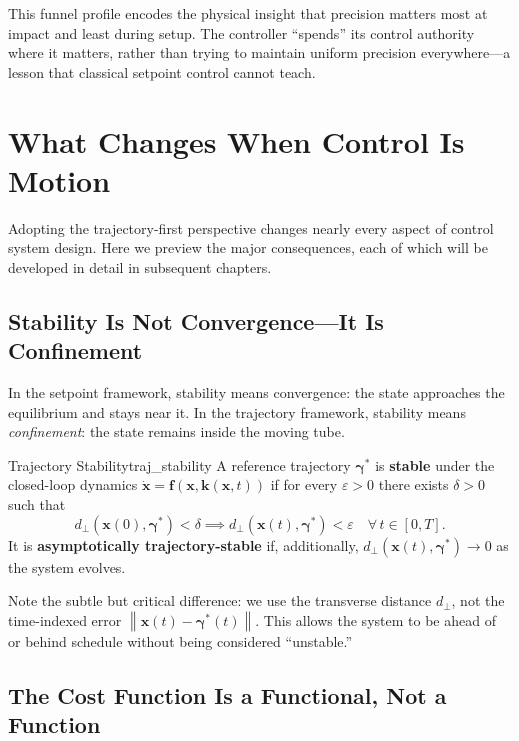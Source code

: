 \documentclass[12pt, openany]{book}
\theoremstyle{plain}
\newcommand{\state}{\bm{x}}
\newcommand{\traj}{\bm{\gamma}}
\newcommand{\norm}[1]{\left\lVert #1 \right\rVert}
\begin{document}
This funnel profile encodes the physical insight that precision matters most at
impact and least during setup. The controller ``spends'' its control authority
where it matters, rather than trying to maintain uniform precision everywhere---a
lesson that classical setpoint control cannot teach.

\section{What Changes When Control Is Motion}

Adopting the trajectory-first perspective changes nearly every aspect of control
system design. Here we preview the major consequences, each of which will be
developed in detail in subsequent chapters.

\subsection{Stability Is Not Convergence---It Is Confinement}

In the setpoint framework, stability means convergence: the state approaches the
equilibrium and stays near it. In the trajectory framework, stability means
\emph{confinement}: the state remains inside the moving tube.

\begin{definition}{Trajectory Stability}{traj_stability}
  A reference trajectory $\traj^*$ is \textbf{stable} under the closed-loop
  dynamics $\dot{\state} = \bm{f}(\state, \bm{k}(\state, t))$ if for every
  $\varepsilon > 0$ there exists $\delta > 0$ such that
  \begin{equation}
    d_\perp(\state(0), \traj^*) < \delta \implies
    d_\perp(\state(t), \traj^*) < \varepsilon \quad \forall\, t \in [0, T].
  \end{equation}
  It is \textbf{asymptotically trajectory-stable} if, additionally,
  $d_\perp(\state(t), \traj^*) \to 0$ as the system evolves.
\end{definition}

Note the subtle but critical difference: we use the transverse distance $d_\perp$,
not the time-indexed error $\norm{\state(t) - \traj^*(t)}$. This allows the system
to be ahead of or behind schedule without being considered ``unstable.''

\subsection{The Cost Function Is a Functional, Not a Function}
\end{document}
